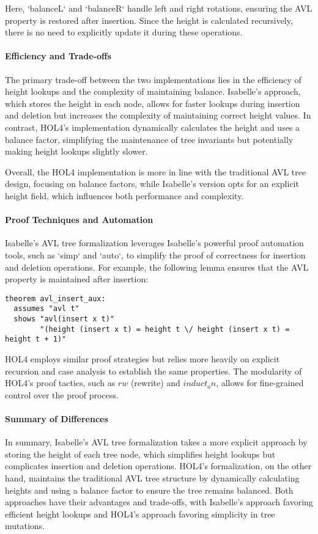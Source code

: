 \documentclass[12pt]{article}
\begin{document}
Here, `balanceL` and `balanceR` handle left and right rotations, ensuring the AVL property is restored after insertion. Since the height is calculated recursively, there is no need to explicitly update it during these operations.

\paragraph{Efficiency and Trade-offs}

The primary trade-off between the two implementations lies in the efficiency of height lookups and the complexity of maintaining balance. Isabelle's approach, which stores the height in each node, allows for faster lookups during insertion and deletion but increases the complexity of maintaining correct height values. In contrast, HOL4’s implementation dynamically calculates the height and uses a balance factor, simplifying the maintenance of tree invariants but potentially making height lookups slightly slower.

Overall, the HOL4 implementation is more in line with the traditional AVL tree design, focusing on balance factors, while Isabelle’s version opts for an explicit height field, which influences both performance and complexity.

\paragraph{Proof Techniques and Automation}
Isabelle’s AVL tree formalization leverages Isabelle’s powerful proof automation tools, such as `simp` and `auto`, to simplify the proof of correctness for insertion and deletion operations. For example, the following lemma ensures that the AVL property is maintained after insertion:

\begin{verbatim}
theorem avl_insert_aux:
  assumes "avl t"
  shows "avl(insert x t)"
        "(height (insert x t) = height t \/ height (insert x t) = height t + 1)"
\end{verbatim}

HOL4 employs similar proof strategies but relies more heavily on explicit recursion and case analysis to establish the same properties. The modularity of HOL4’s proof tactics, such as \(rw\) (rewrite) and \(induct_on\), allows for fine-grained control over the proof process.

\paragraph{Summary of Differences}
In summary, Isabelle’s AVL tree formalization takes a more explicit approach by storing the height of each tree node, which simplifies height lookups but complicates insertion and deletion operations. HOL4’s formalization, on the other hand, maintains the traditional AVL tree structure by dynamically calculating heights and using a balance factor to ensure the tree remains balanced. Both approaches have their advantages and trade-offs, with Isabelle’s approach favoring efficient height lookups and HOL4’s approach favoring simplicity in tree mutations.
\end{document}

